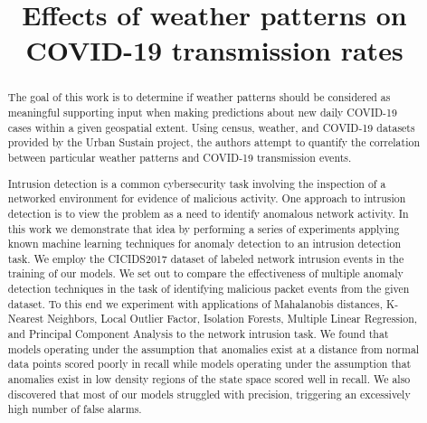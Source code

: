 \documentclass[conference]{IEEEtran}
\begin{document}
\title{Effects of weather patterns on COVID-19 transmission rates}

\author{
\and

\and

}

\maketitle

\begin{abstract}
The goal of this work is to determine if weather patterns should be considered as meaningful supporting input when making predictions about new daily COVID-19 cases within a given geospatial extent. Using census, weather, and COVID-19 datasets provided by the Urban Sustain project, the authors attempt to quantify the correlation between particular weather patterns and COVID-19 transmission events.

Intrusion detection is a common cybersecurity task involving the inspection of a networked environment for evidence of malicious activity. One approach to intrusion detection is to view the problem as a need to identify anomalous network activity. In this work we demonstrate that idea by performing a series of experiments applying known machine learning techniques for anomaly detection to an intrusion detection task. We employ the CICIDS2017 dataset of labeled network intrusion events in the training of our models. We set out to compare the effectiveness of multiple anomaly detection techniques in the task of identifying malicious packet events from the given dataset. To this end we experiment with applications of Mahalanobis distances, K-Nearest Neighbors, Local Outlier Factor, Isolation Forests, Multiple Linear Regression, and Principal Component Analysis to the network intrusion task. We found that models operating under the assumption that anomalies exist at a distance from normal data points scored poorly in recall while models operating under the assumption that anomalies exist in low density regions of the state space scored well in recall. We also discovered that most of our models struggled with precision, triggering an excessively high number of false alarms.
\end{abstract}
\end{document}
